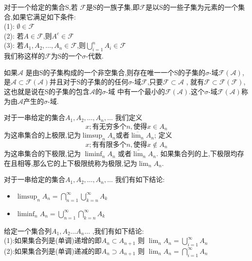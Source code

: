 \begin{Definition}
    对于一个给定的集合S,若 \(\mathscr{F}\)是S的一族子集,即\(\mathscr{F}\)是以S的一些子集为元素的一个集合,如果它满足如下条件: \\ 
    (1): \(\emptyset \in \mathscr{F}\) \\ 
    (2): 若\(A \in \mathscr{F}\),则\(A^c \in \mathscr{F}\) \\ 
    (3): 若\(A_1,A_2,\dots,A_n \in \mathscr{F}\),则\(\bigcup\limits_{i=1}^{n} A_i \in \mathscr{F}\) \\
    我们称这样的\(\mathscr{F}\)为S的一个\(\sigma\)-代数.
\end{Definition}
\begin{Theorem}
    如果\(\mathscr{A}\) 是由S的子集构成的一个非空集合,则存在唯一一个S的子集的\(\sigma\)-域\(\mathscr{F} (\mathscr{A})\),是\(\mathscr{A} \subset \mathscr{F}(\mathscr{A})\)并且对于S的子集的的任何\(\sigma\)-域\(\mathscr{F}\),只要\(\mathscr{F} \subset \mathscr{A}\) , 就有\(\mathscr{F} \subset \mathscr{F}(\mathscr{F})\),这也就是说在S的子集的包含\(\mathscr{A}\)的\(\sigma\)-域 中有一个最小的\(\mathscr{F}(\mathscr{A})\).这个\(\sigma\)-域\(\mathscr{F}(\mathscr{A})\)称为由\(\mathscr{A}\)产生的\(\sigma\)-域.
\end{Theorem}
对于一串给定的集合\(A_1,A_2 ,\dots , A_n , \dots  \) 我们定义 \[x ; 有无穷多个n , 使得 x \in A_n\]
为这串集合的上极限,记为\(\limsup_{n} A_n \)或者\(\overline{\lim_{n}}A_n\);
定义 \[ x ; 有有限多个n , 使得x \notin A_n\]
为这串集合的下极限,记为  \(\liminf_{n}A_n\) 或者\(\widetilde{\lim_{n}}A_n\).
如果集合列的上,下极限均存在且相等,那么它的上下极限统称为极限,记为\(\lim_{n}A_n\).
\begin{Theorem}
    对于一串给定的集合\(A_1,A_2 ,\dots , A_n , \dots  \) 我们有如下结论:
    \begin{itemize}[itemsep=2pt,topsep=0pt,parsep=0pt]
        \item \(\limsup_{n} A_n = \bigcap\limits_{n=1}^{\infty} \bigcup\limits_{k=n}^{\infty} A_k\) \\
        \item \(\liminf_{n} A_n = \bigcup\limits_{n=1}^{\infty} \bigcap\limits_{k=n}^{\infty} A_k\) \\
    \end{itemize}
\end{Theorem}
\begin{Theorem}
    给定一个集合列\(A_1 , A_2 \dots A_n \dots \) ,我们有如下结论: \\ 
    (1):如果集合列是(单调)递增的即\(A_n \subset A_{n+1}\) 则 \(\lim_{n}A_n = \bigcup\limits_{i=1}^{\infty} A_n\) \\
    (2):如果集合列是(单调)递减的即\(A_n \supset A_{n+1}\) 则 \(\lim_{n}A_n = \bigcap\limits_{i=1}^{\infty} A_n\) \\
\end{Theorem}
